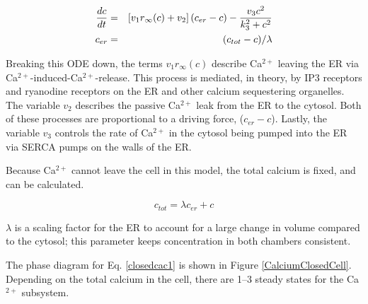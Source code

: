 \documentclass[12pt]{article}
\def\ca{Ca$^{2+}$\xspace}
\def\ctot{c_{tot}}
\def\cer{c_{er}}
\def\rinf{r_\infty}
\def\rinf{r_\infty}
\begin{document}
\begin{eqnarray}
  \ddt{c} &=&  \left[ v_1  \rinf (c)+ v_2 \right] (\cer - c ) - \frac{v_3 c^2}{k_3^2+c^2} \label{closedcac1}\\
  \cer &=& (\ctot-c)/\lambda \label{closedcac2}
\end{eqnarray}

Breaking this ODE down, the terms $v_1r_\infty(c)$ describe \ca leaving the ER via \ca-induced-\ca-release. This process is mediated, in theory, by IP3 receptors and ryanodine receptors on the ER and other calcium sequestering organelles. The variable $v_2$ describes the passive \ca leak from the ER to the cytosol. Both of these processes are proportional to a driving force, ($\cer-c$). Lastly, the variable $v_3$ controls the rate of \ca in the cytosol being pumped into the ER via SERCA pumps on the walls of the ER. 

Because \ca cannot leave the cell in this model, the total calcium is fixed, and can be calculated.

\begin{equation}
\ctot=\lambda\cer+c \label{catot_preeq}
\end{equation}

$\lambda$ is a scaling factor for the ER to account for a large change in volume compared to the cytosol; this parameter keeps concentration in both chambers consistent. 

The phase diagram for Eq. \ref{closedcac1} is shown in Figure \ref{CalciumClosedCell}. Depending on the total calcium in the cell, there are 1--3 steady states for the \ca subsystem.

\def\figthetam{0.25}
\def\figkm{0.04}
\def\figthetah{0.3}
\def\figkh{-0.06}
\def\figlambda{0.15}
\def\figvone{40}
\def\figvtwo{0.5}
\def\figvthree{120}
\def\figkthree{0.3}
\end{document}
